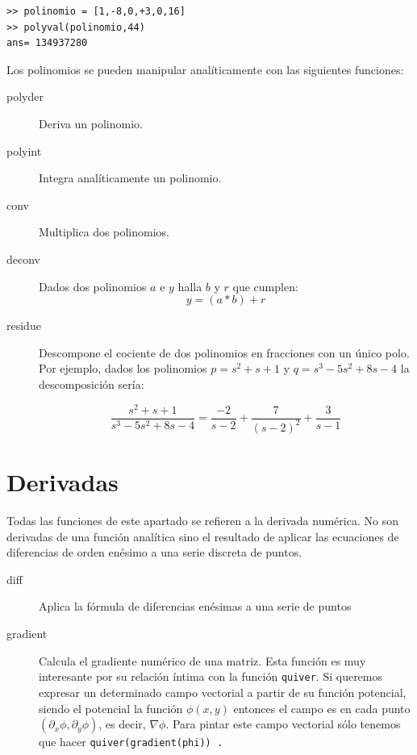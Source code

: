 \begin{verbatim}
>> polinomio = [1,-8,0,+3,0,16]
>> polyval(polinomio,44)
ans= 134937280
\end{verbatim}
Los polinomios se pueden manipular analíticamente con las siguientes
funciones:

\begin{description}
\item [polyder\texttt{}]Deriva un polinomio.
\item [polyint\texttt{}]Integra analíticamente un
  polinomio.
\item [conv]Multiplica dos polinomios.
\item [deconv]Dados dos polinomios $a$ e $y$ halla $b$ y
  $r$ que cumplen:\[ y=(a*b)+r\]

\item [residue]Descompone el cociente de dos polinomios
  en fracciones con un único polo. Por ejemplo, dados los polinomios
  $p=s^{2}+s+1$ y $q=s^{3}-5s^{2}+8s-4$ la descomposición sería:

$$\frac{s^{2}+s+1}{s^{3}-5s^{2}+8s-4}=
\frac{-2}{s-2}+\frac{7}{(s-2)^{2}}+\frac{3}{s-1}$$

\end{description}



\section{Derivadas}

Todas las funciones de este apartado se refieren a la derivada
numérica.  No son derivadas de una función analítica sino el resultado
de aplicar las ecuaciones de diferencias de orden enésimo a una serie
discreta de puntos.

\begin{description}
\item [diff\texttt{}]Aplica la fórmula de diferencias
  enésimas a una serie de puntos
\item [gradient\texttt{}]Calcula el gradiente numérico
  de una matriz. Esta función es muy interesante por su relación
  íntima con la función \texttt{quiver}. Si queremos expresar un
  determinado campo vectorial a partir de su función potencial, siendo
  el potencial la función $\phi(x,y)$ entonces el campo es en cada
  punto $\left(\partial_{x}\phi,\partial_{y}\phi\right)$, es decir,
  $\nabla\phi$. Para pintar este campo vectorial sólo tenemos que
  hacer \texttt{quiver(gradient(phi)) .}
\end{description}

